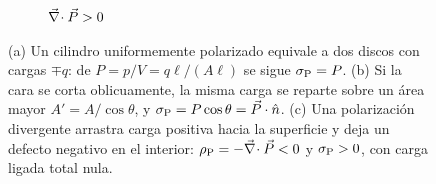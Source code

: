 \begin{figure}[t]
\begin{subfigure}[b]{0.23\textwidth}
\caption{$\vec\nabla\!\cdot\vec P>0$}
\end{subfigure}
\caption{(a) Un cilindro uniformemente polarizado equivale a dos discos con cargas $\mp q$: de
$P=p/V=q\ell/(A\ell)$ se sigue $\sigma_{\mathrm P}=P$. (b) Si la cara se corta oblicuamente, la misma carga se
reparte sobre un área mayor $A'=A/\cos\theta$, y $\sigma_{\mathrm P}=P\cos\theta=\vec P\cdot\hat n$. (c) Una polarización
divergente arrastra carga positiva hacia la superficie y deja un defecto negativo en el interior:
$\rho_{\mathrm P}=-\vec\nabla\!\cdot\vec P<0$ y $\sigma_{\mathrm P}>0$, con carga ligada total nula.}
\label{fig:cilindro-uniforme}
\end{figure}
